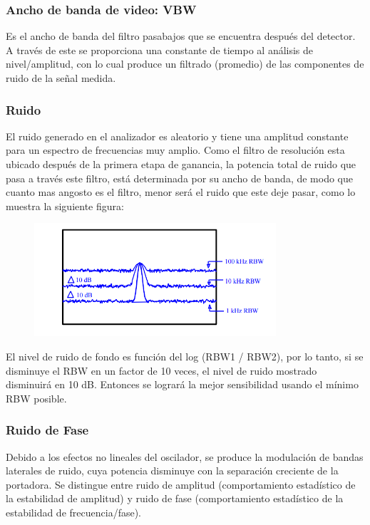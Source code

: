 \documentclass[a4paper,12pt,twoside]{article}
\begin{document}
\subsubsection{Ancho de banda de video: VBW}

Es el ancho de banda del filtro pasabajos que se encuentra después del detector.
A través de este se proporciona una constante de tiempo al análisis de nivel/amplitud, con lo cual
produce un filtrado (promedio) de las componentes de ruido de la señal medida. 

\subsubsection{Ruido}

El ruido generado en el analizador es aleatorio y tiene una amplitud constante para un
espectro de frecuencias muy amplio. Como el filtro de resolución esta ubicado después de
la primera etapa de ganancia, la potencia total de ruido que pasa a través este filtro, está
determinada por su ancho de banda, de modo que cuanto mas angosto es el filtro, menor
será el ruido que este deje pasar, como lo muestra la siguiente figura:

\begin{figure}[H]
    \centering
    \includegraphics[width=0.8\textwidth]{../img/ruido.png}
\end{figure}

El nivel de ruido de fondo es función del log (RBW1 / RBW2), por lo tanto, si se
disminuye el RBW en un factor de 10 veces, el nivel de ruido mostrado disminuirá en 10
dB.
Entonces se logrará la mejor sensibilidad usando el mínimo RBW posible. 

\subsubsection{Ruido de Fase}

Debido a los efectos no lineales del oscilador, se produce la modulación de bandas laterales
de ruido, cuya potencia disminuye con la separación creciente de la portadora.
Se distingue entre ruido de amplitud (comportamiento estadístico de la estabilidad de
amplitud) y ruido de fase (comportamiento estadístico de la estabilidad de frecuencia/fase).
\end{document}
